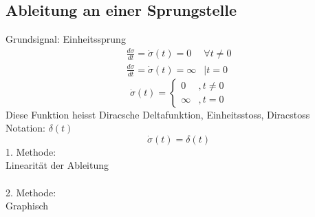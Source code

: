 \subsection{Ableitung an einer Sprungstelle}
Grundsignal: Einheitssprung\\
\[ \boxed{\begin{array}{ll}
\frac{d \sigma}{d t} = \dot{\sigma}(t) = 0 & \forall t \neq 0 \\
\frac{d \sigma}{d t} = \dot{\sigma}(t) = \infty & | t =   0
\end{array}
} \]
\[ \boxed{\dot{\sigma}(t) = \left\lbrace 
\begin{array}{ll}0&, t \neq 0\\\infty&, t = 0\end{array} \right.} \]
Diese Funktion heisst Diracsche Deltafunktion, Einheitsstoss, Diracstoss\\
Notation: $\delta(t)$
\[ \boxed{\dot{\sigma}(t) = \delta(t)} \]
1. Methode: \\
Linearität der Ableitung\\\\
2. Methode: \\
Graphisch\\
